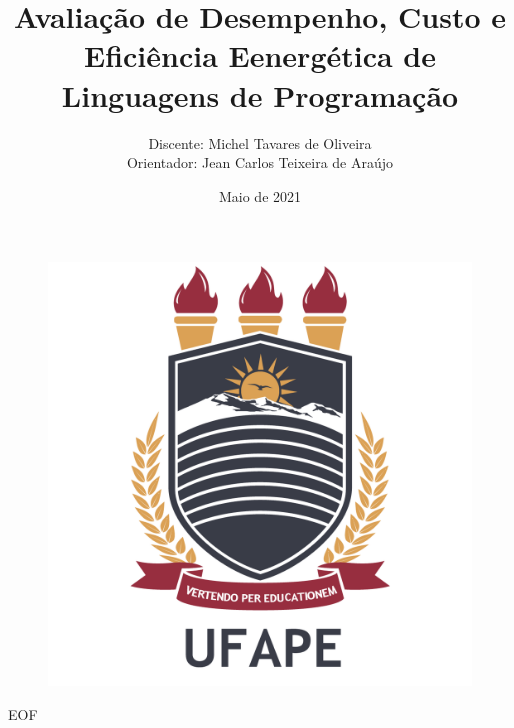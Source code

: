\documentclass[aspectratio=169]{beamer}
\author{Discente: Michel Tavares de Oliveira  \\ Orientador: Jean Carlos Teixeira de Araújo}
\title[Avaliação de Desempenho, Custo e Eficiência
Eenergética de Linguagens de Programação]{Avaliação de Desempenho, Custo e Eficiência
Eenergética de Linguagens de Programação}
\institute{Universidade Federal do Agreste de Pernambuco}
\date{Maio de 2021}
\begin{document}
\begin{frame}
    \titlepage
    \vspace{-10pt}
    \begin{figure}[htpb]
        \begin{center}
            \includegraphics[width=0.13\linewidth]{images/ufapelogo.png}
        \end{center}
    \end{figure}
\end{frame}

\begin{frame}
    \tableofcontents[sectionstyle=show,subsectionstyle=show/shaded/hide,subsubsectionstyle=show/shaded/hide]
\end{frame}












%







\begin{frame}[allowframebreaks]
    \printbibliography
\end{frame}

\begin{frame}
    \begin{center}
        {\Huge EOF}
    \end{center}
\end{frame}
\end{document}
